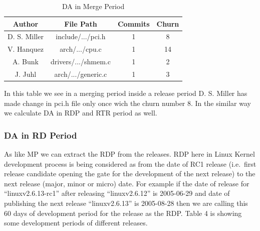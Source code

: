 \documentclass{acm_proc_article-sp}
\begin{document}
\begin{table}[ht]
\caption{DA in Merge Period}  %
\centering 						%
\begin{tabular}{c c c c}				%
\hline\hline						%
Author		& File Path			& Commits		& Churn \\ [0.5ex]
\hline 							%
D. S. Miller	& include/.../pci.h		& 1				& 8 \\
V. Hanquez	& arch/.../cpu.c		& 1				& 14 \\
A. Bunk		& drivers/.../shmem.c	& 1				& 2 \\
J. Juhl		& arch/.../generic.c		& 1				& 3 \\
[1ex]							%
\hline 							%
\end{tabular}
\label{table:nonlin} 				%
\end{table}

In this table we see in a merging period inside a release period D. S. Miller has made change in pci.h file only once wich the churn number 8. In the similar way we calculate DA in RDP and RTR period as well.

\subsubsection{DA in RD Period}
As like MP we can extract the RDP from the releases. RDP here in Linux Kernel development process is being considered as from the date of RC1 release (i.e.\ first release candidate opening the gate for the development of the next release) to the next release (major, minor or micro) date. For example if the date of release for ``linuxv2.6.13-rc1'' after releasing ``linuxv2.6.12'' is 2005-06-29 and date of publishing the next release ``linuxv2.6.13'' is 2005-08-28 then we are calling this 60 days of development period for the release as the RDP. Table 4 is showing some development periods of different releases.
\end{document}
